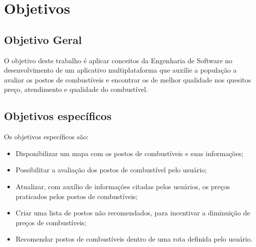 \section{Objetivos}

\subsection{Objetivo Geral}

O objetivo deste trabalho é aplicar conceitos da Engenharia de Software no desenvolvimento de um aplicativo multiplataforma que auxilie a população a avaliar os postos de combustíveis e encontrar os de melhor qualidade nos quesitos preço, atendimento e qualidade do combustível.

\subsection{Objetivos específicos}

Os objetivos específicos são:
\begin{itemize}
    \item Disponibilizar um mapa com os postos de combustíveis e suas informações;
    \item Possibilitar a avaliação dos postos de combustível pelo usuário;
    \item Atualizar, com auxílio de informações citadas pelos usuários, os preços praticados pelos postos de combustíveis;
    \item Criar uma lista de postos não recomendados, para incentivar a diminuição de preços de combustíveis;
    \item Recomendar postos de combustíveis dentro de uma rota definida pelo usuário.
\end{itemize}
